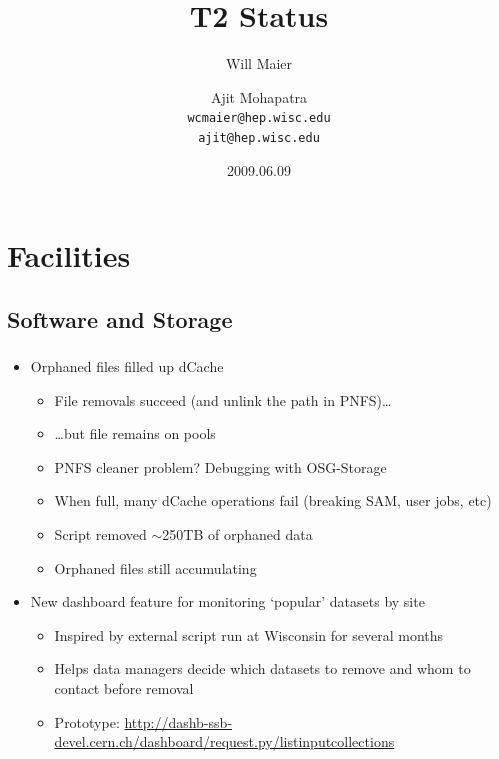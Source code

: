 \documentclass{beamer}
\title{T2 Status}
\author[Maier, Mohapatra]{
    Will Maier \and Ajit Mohapatra\\ 
    {\tt wcmaier@hep.wisc.edu}\\
    {\tt ajit@hep.wisc.edu}}
\institute[Wisconsin]{University of Wisconsin - High Energy Physics}
\date{2009.06.09}
\newcommand{\ca}{\ensuremath{\sim}}
\begin{document}
\begin{frame}
    \titlepage
\end{frame}


\section{Facilities}
\subsection{Software and Storage}
\begin{frame}
\frametitle{}
\begin{itemize}
	\item Orphaned files filled up dCache
	\begin{itemize}
		\item File removals succeed (and unlink the path in PNFS)\ldots{}
		\item \ldots{}but file remains on pools
		\item PNFS cleaner problem? Debugging with OSG-Storage
		\item When full, many dCache operations fail (breaking SAM, user jobs, etc)
		\item Script removed \ca{}250TB of orphaned data
		\item Orphaned files still accumulating
	\end{itemize}
	\item New dashboard feature for monitoring `popular' datasets by site
	\begin{itemize}
		\item Inspired by external script run at Wisconsin for several months
		\item Helps data managers decide which datasets to remove and whom to contact before removal
		\item Prototype: \url{http://dashb-ssb-devel.cern.ch/dashboard/request.py/listinputcollections}
	\end{itemize}
\end{itemize}
\end{frame}
\end{document}
